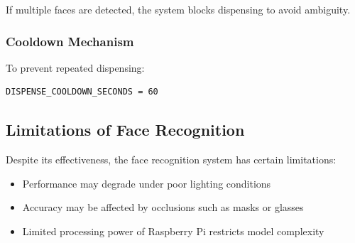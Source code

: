 If multiple faces are detected, the system blocks dispensing to avoid ambiguity.

\subsubsection{Cooldown Mechanism}

To prevent repeated dispensing:

\begin{verbatim}
DISPENSE_COOLDOWN_SECONDS = 60
\end{verbatim}

\subsection{Limitations of Face Recognition}

Despite its effectiveness, the face recognition system has certain limitations:

\begin{itemize}
    \item Performance may degrade under poor lighting conditions
    \item Accuracy may be affected by occlusions such as masks or glasses
    \item Limited processing power of Raspberry Pi restricts model complexity
\end{itemize}